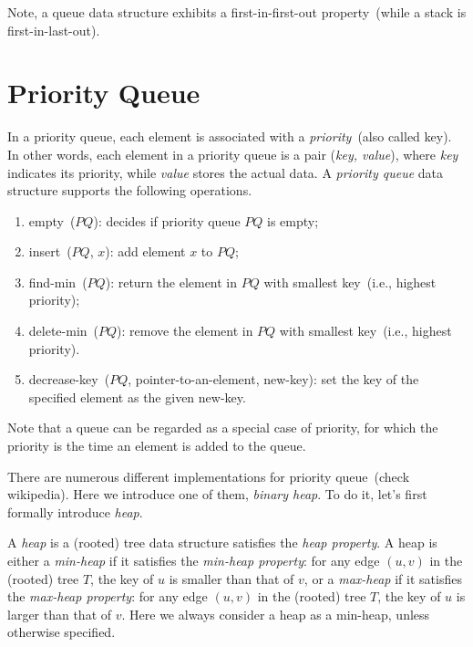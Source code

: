 Note, a queue data structure exhibits a first-in-first-out property~(while a stack is first-in-last-out).

\section*{Priority Queue}

In a priority queue, each element is associated with a \emph{priority}~(also called key).
In other words, each element in a priority queue is a pair (\emph{key, value}),
where \emph{key} indicates its priority, while \emph{value} stores the actual data.
A \emph{priority queue} data structure supports the following operations.
\vspace*{-\topsep}
\begin{enumerate}
\item empty~($PQ$): decides if priority queue $PQ$ is empty;
\item insert~($PQ$, $x$): add element $x$ to $PQ$;
\item find-min~($PQ$): return the element in $PQ$ with smallest key~(i.e., highest priority);
\item delete-min~($PQ$): remove the element in $PQ$ with smallest key~(i.e., highest priority).
\item decrease-key~($PQ$, pointer-to-an-element, new-key): set the key of the specified element as the given new-key.
\end{enumerate}

Note that a queue can be regarded as a special case of priority, for which the priority
is the time an element is added to the queue.

There are numerous different implementations for priority queue~(check wikipedia). 
Here we introduce one of them, \emph{binary heap}. To do it, let's first
formally introduce \emph{heap}.


A \emph{heap} is a (rooted) tree data structure satisfies the \emph{heap property}.
A heap is either a \emph{min-heap} if it satisfies the \emph{min-heap property}: for any edge $(u, v)$ in the (rooted) tree $T$,
the key of $u$ is smaller than that of $v$,
or a \emph{max-heap} if it satisfies the \emph{max-heap property}: for any edge $(u, v)$ in the (rooted) tree $T$,
the key of $u$ is larger than that of $v$.
Here we always consider a heap as a min-heap, unless otherwise specified.

